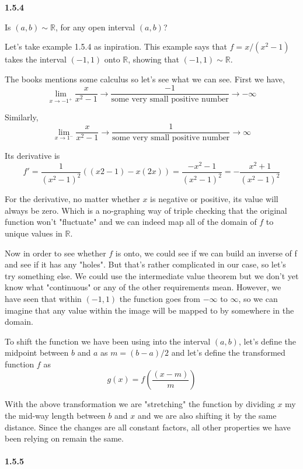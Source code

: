\textbf{1.5.4}

Is $(a,b) \sim \mathbb{R}$, for any open interval $(a,b)$?

Let's take example 1.5.4 as inpiration.
This example says that $f = x / (x^2 -1)$ takes the interval $(-1, 1)$ onto $\mathbb{R}$, showing that
$(-1,1) \sim \mathbb{R}$.

The books mentions some calculus so let's see what we can see.
First we have,
$$
\lim_{x \rightarrow -1^+ } \frac{x}{x^2 - 1} \rightarrow
    \frac{-1}{\text{some very small positive number}} 
    \rightarrow -\infty
$$

Similarly,
$$
\lim_{x \rightarrow 1^- } \frac{x}{x^2 - 1} \rightarrow
    \frac{1}{\text{some very small positive number}} 
    \rightarrow \infty
$$

Its derivative is
$$
f' = \frac{1}{(x^2 - 1)^2} ( (x2 - 1) - x(2x) ) =
    \frac{-x^2 - 1}{(x^2 - 1)^2} =
    - \frac{x^2 + 1}{(x^2 - 1)^2}
$$

For the derivative, no matter whether $x$ is negative or positive, its value will always be zero.
Which is a no-graphing way of triple checking that the original function won't "fluctuate" and we can indeed map all of
the domain of $f$ to unique values in $\mathbb{R}$.

Now in order to see whether $f$ is onto, we could see if we can build an inverse of f and see if it has any "holes".
But that's rather complicated in our case, so let's try something else.
We could use the intermediate value theorem but we don't yet know what "continuous" or any of the other requirements mean.
However, we have seen that within $(-1,1)$ the function goes from $-\infty$ to $\infty$, so we can imagine that any value
within the image will be mapped to by somewhere in the domain.

To shift the function we have been using into the interval $(a,b)$, let's define the midpoint between $b$ and $a$ as
$m = (b-a)/2$ and let's define the transformed function $f$ as
$$
g(x) = f\left(\frac{(x - m)}{m} \right)
$$

With the above transformation we are "stretching" the function by dividing $x$ my the mid-way length between $b$ and $x$
and we are also shifting it by the same distance.
Since the changes are all constant factors, all other properties we have been relying on remain the same.
\\~\\



\textbf{1.5.5}

